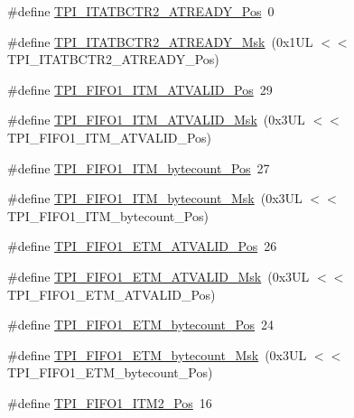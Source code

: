\begin{DoxyCompactItemize}
\#define \hyperlink{group___c_m_s_i_s___t_p_i_ga6959f73d7db4a87ae9ad9cfc99844526}{T\+P\+I\+\_\+\+I\+T\+A\+T\+B\+C\+T\+R2\+\_\+\+A\+T\+R\+E\+A\+D\+Y\+\_\+\+Pos}~0
\item 
\#define \hyperlink{group___c_m_s_i_s___t_p_i_ga1859502749709a2e5ead9a2599d998db}{T\+P\+I\+\_\+\+I\+T\+A\+T\+B\+C\+T\+R2\+\_\+\+A\+T\+R\+E\+A\+D\+Y\+\_\+\+Msk}~(0x1\+U\+L $<$$<$ T\+P\+I\+\_\+\+I\+T\+A\+T\+B\+C\+T\+R2\+\_\+\+A\+T\+R\+E\+A\+D\+Y\+\_\+\+Pos)
\item 
\#define \hyperlink{group___c_m_s_i_s___t_p_i_ga08edfc862b2c8c415854cc4ae2067dfb}{T\+P\+I\+\_\+\+F\+I\+F\+O1\+\_\+\+I\+T\+M\+\_\+\+A\+T\+V\+A\+L\+I\+D\+\_\+\+Pos}~29
\item 
\#define \hyperlink{group___c_m_s_i_s___t_p_i_gabc1f6a3b6cac0099d7c01ca949b4dd08}{T\+P\+I\+\_\+\+F\+I\+F\+O1\+\_\+\+I\+T\+M\+\_\+\+A\+T\+V\+A\+L\+I\+D\+\_\+\+Msk}~(0x3\+U\+L $<$$<$ T\+P\+I\+\_\+\+F\+I\+F\+O1\+\_\+\+I\+T\+M\+\_\+\+A\+T\+V\+A\+L\+I\+D\+\_\+\+Pos)
\item 
\#define \hyperlink{group___c_m_s_i_s___t_p_i_gaa22ebf7c86e4f4b2c98cfd0b5981375a}{T\+P\+I\+\_\+\+F\+I\+F\+O1\+\_\+\+I\+T\+M\+\_\+bytecount\+\_\+\+Pos}~27
\item 
\#define \hyperlink{group___c_m_s_i_s___t_p_i_gacba2edfc0499828019550141356b0dcb}{T\+P\+I\+\_\+\+F\+I\+F\+O1\+\_\+\+I\+T\+M\+\_\+bytecount\+\_\+\+Msk}~(0x3\+U\+L $<$$<$ T\+P\+I\+\_\+\+F\+I\+F\+O1\+\_\+\+I\+T\+M\+\_\+bytecount\+\_\+\+Pos)
\item 
\#define \hyperlink{group___c_m_s_i_s___t_p_i_ga3177b8d815cf4a707a2d3d3d5499315d}{T\+P\+I\+\_\+\+F\+I\+F\+O1\+\_\+\+E\+T\+M\+\_\+\+A\+T\+V\+A\+L\+I\+D\+\_\+\+Pos}~26
\item 
\#define \hyperlink{group___c_m_s_i_s___t_p_i_ga0e8f29a1e9378d1ceb0708035edbb86d}{T\+P\+I\+\_\+\+F\+I\+F\+O1\+\_\+\+E\+T\+M\+\_\+\+A\+T\+V\+A\+L\+I\+D\+\_\+\+Msk}~(0x3\+U\+L $<$$<$ T\+P\+I\+\_\+\+F\+I\+F\+O1\+\_\+\+E\+T\+M\+\_\+\+A\+T\+V\+A\+L\+I\+D\+\_\+\+Pos)
\item 
\#define \hyperlink{group___c_m_s_i_s___t_p_i_gaab31238152b5691af633a7475eaf1f06}{T\+P\+I\+\_\+\+F\+I\+F\+O1\+\_\+\+E\+T\+M\+\_\+bytecount\+\_\+\+Pos}~24
\item 
\#define \hyperlink{group___c_m_s_i_s___t_p_i_gab554305459953b80554fdb1908b73291}{T\+P\+I\+\_\+\+F\+I\+F\+O1\+\_\+\+E\+T\+M\+\_\+bytecount\+\_\+\+Msk}~(0x3\+U\+L $<$$<$ T\+P\+I\+\_\+\+F\+I\+F\+O1\+\_\+\+E\+T\+M\+\_\+bytecount\+\_\+\+Pos)
\item 
\#define \hyperlink{group___c_m_s_i_s___t_p_i_ga1828c228f3940005f48fb8dd88ada35b}{T\+P\+I\+\_\+\+F\+I\+F\+O1\+\_\+\+I\+T\+M2\+\_\+\+Pos}~16
$$
\end{DoxyCompactItemize}
